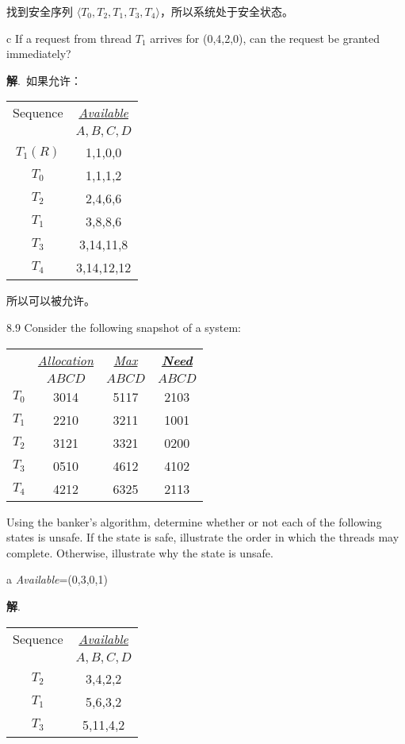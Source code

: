 \documentclass[12pt,a4paper]{article}
\newenvironment{problems}{\begin{list}{}{\renewcommand{\makelabel}[1]{\textbf{##1}\hfil}}}{\end{list}}
\newenvironment{steps}{\begin{list}{}{\renewcommand{\makelabel}[1]{##1.\hfil}}}{\end{list}}
\providecommand{\sol}{\textbf{解}.~}
\begin{document}
\begin{problems}
\begin{steps}
        找到安全序列 $\langle T_0,T_2,T_1,T_3,T_4\rangle $，所以系统处于安全状态。
        \item[c] If a request from thread $T_1$ arrives for (0,4,2,0), can the request be granted immediately?
        
        \sol 如果允许：

        \begin{tabular}{cc}
            Sequence  & \underline{\emph{Available}} \\
              & $A,B,C,D$ \\
          $T_1(R)$ & 1,1,0,0 \\
          $T_0$ & 1,1,1,2 \\
          $T_2$ & 2,4,6,6 \\
          $T_1$ & 3,8,8,6\\
          $T_3$ & 3,14,11,8\\
          $T_4$ & 3,14,12,12
        \end{tabular}

        所以可以被允许。
    \end{steps}

    \item[8.9] Consider the following snapshot of a system:
    
    \begin{tabular}{cccc}
        & \underline{\emph{Allocation}} & \underline{\emph{Max}} & \underline{\emph{\textbf{Need}}}\\
        & $ABCD$ & $ABCD$ & $ABCD$\\
   $T_0$ & 3014 & 5117 & 2103\\
   $T_1$ & 2210 & 3211 & 1001\\
   $T_2$ & 3121 & 3321 & 0200\\
   $T_3$ & 0510 & 4612 & 4102\\
   $T_4$ & 4212 & 6325 & 2113
   \end{tabular} 
    
   Using the banker's algorithm, determine whether or not each of the following states is unsafe. If the state is safe, illustrate the order in which the threads may complete. Otherwise, illustrate why the state is unsafe.

   \begin{steps}
       \item[a] \emph{Available}=(0,3,0,1)
       
       \sol \begin{tabular}{cc}
        Sequence  & \underline{\emph{Available}} \\
          & $A,B,C,D$ \\
      $T_2$ & 3,4,2,2 \\
      $T_1$ & 5,6,3,2 \\
      $T_3$ & 5,11,4,2
      \end{tabular} 


\end{steps}
\end{problems}
\end{document}
